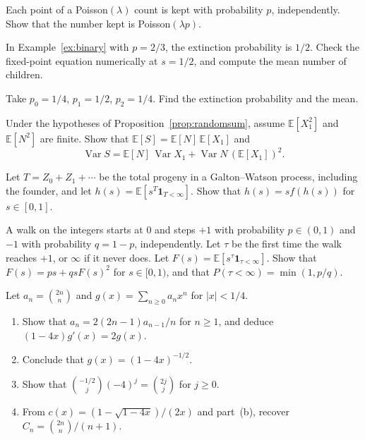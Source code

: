 \begin{exercise}[$\star$]\label{ex:thinning}
Each point of a Poisson$(\lambda)$ count is kept with probability $p$, independently. Show that the number kept is Poisson$(\lambda p)$.
\end{exercise}

\begin{exercise}[$\star$]\label{ex:golden}
In Example~\ref{ex:binary} with $p=2/3$, the extinction probability is $1/2$. Check the fixed-point equation numerically at $s=1/2$, and compute the mean number of children.
\end{exercise}

\begin{exercise}[$\star\star$]\label{ex:lotka}
Take $p_0=1/4$, $p_1=1/2$, $p_2=1/4$. Find the extinction probability and the mean.
\end{exercise}

\begin{exercise}[$\star\star$]\label{ex:randomsumvar}
Under the hypotheses of Proposition~\ref{prop:randomsum}, assume $\mathbb E[X_1^2]$ and $\mathbb E[N^2]$ are finite. Show that $\mathbb E[S]=\mathbb E[N]\,\mathbb E[X_1]$ and
\[
 \operatorname{Var}S=\mathbb E[N]\,\operatorname{Var}X_1+\operatorname{Var}N\,(\mathbb E[X_1])^2.
\]
\end{exercise}

\begin{exercise}[$\star\star$]\label{ex:progeny}
Let $T=Z_0+Z_1+\cdots$ be the total progeny in a Galton--Watson process, including the founder, and let $h(s)=\mathbb E[s^T\mathbf 1_{T<\infty}]$. Show that $h(s)=s f(h(s))$ for $s\in[0,1]$.
\end{exercise}

\begin{exercise}[$\star\star$]\label{ex:firstpassage}
A walk on the integers starts at $0$ and steps $+1$ with probability $p\in(0,1)$ and $-1$ with probability $q=1-p$, independently. Let $\tau$ be the first time the walk reaches $+1$, or $\infty$ if it never does. Let $F(s)=\mathbb E[s^\tau\mathbf 1_{\tau<\infty}]$. Show that $F(s)=ps+qs F(s)^2$ for $s\in[0,1)$, and that $P(\tau<\infty)=\min(1,p/q)$.
\end{exercise}

\begin{exercise}[$\star\star$]\label{ex:binseries}
Let $a_n=\binom{2n}{n}$ and $g(x)=\sum_{n\ge0}a_n x^n$ for $|x|<1/4$.
\begin{enumerate}[label=(\alph*)]
\item Show that $a_n=2(2n-1)a_{n-1}/n$ for $n\ge1$, and deduce $(1-4x)g'(x)=2g(x)$.
\item Conclude that $g(x)=(1-4x)^{-1/2}$.
\item Show that $\binom{-1/2}{j}(-4)^j=\binom{2j}{j}$ for $j\ge0$.
\item From $c(x)=(1-\sqrt{1-4x})/(2x)$ and part~(b), recover $C_n=\binom{2n}{n}/(n+1)$.
\end{enumerate}
\end{exercise}

